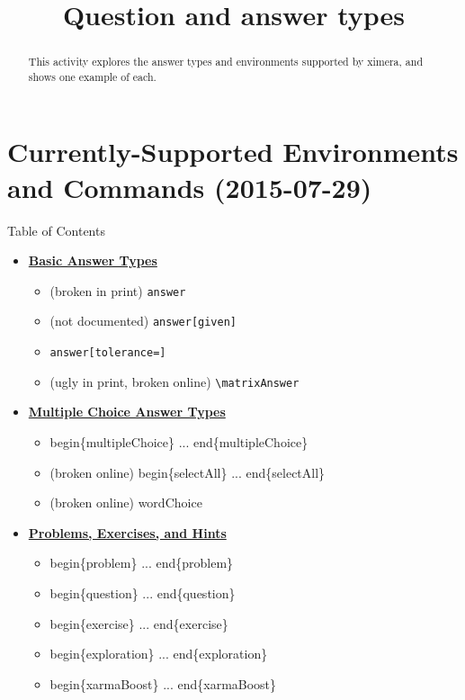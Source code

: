 \documentclass{ximera}
\title{Question and answer types}
\begin{document}
\begin{abstract}
  This activity explores the answer types and environments supported by ximera, and shows one example of each.
\end{abstract}

\maketitle

\section{Currently-Supported Environments and Commands (2015-07-29)}

\begin{remark} Table of Contents

\begin{itemize}
\item \hyperref[BasicAnswerType]{\textbf{Basic Answer Types}}
  \begin{itemize}
    \item (broken in print) \verb!answer!
    \item (not documented) \verb!answer[given]!
    \item \verb!answer[tolerance=]!
    \item (ugly in print, broken online) \verb!\matrixAnswer!
  \end{itemize}
\item \hyperref[MCAnswerType]{\textbf{Multiple Choice Answer Types}}
  \begin{itemize}
    \item begin\{multipleChoice\} ... end\{multipleChoice\}
    \item (broken online) begin\{selectAll\} ... end\{selectAll\}
    \item (broken online) wordChoice
  \end{itemize}    
\item \hyperref[ProblemContainers]{\textbf{Problems, Exercises, and Hints}}
  \begin{itemize}
    \item begin\{problem\} ... end\{problem\}
    \item begin\{question\} ... end\{question\}
    \item begin\{exercise\} ... end\{exercise\}
    \item begin\{exploration\} ... end\{exploration\}
    \item begin\{xarmaBoost\} ... end\{xarmaBoost\}

\end{itemize}
\end{itemize}
\end{remark}
\end{document}
